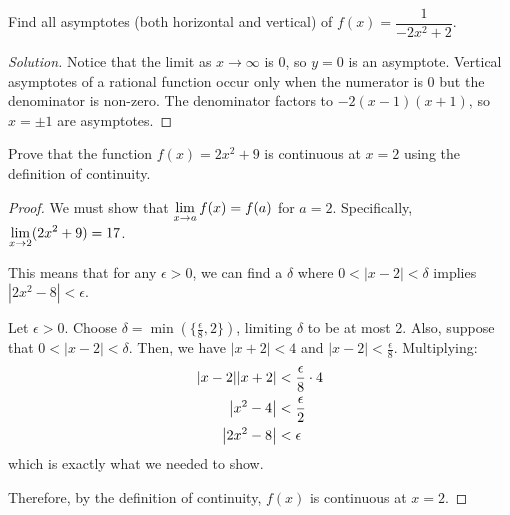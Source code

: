 \question Find all asymptotes (both horizontal and vertical) of $f(x) = \dfrac{1}{-2x^2+2}$.
\begin{proof}[Solution]
  Notice that the limit as $x \to \infty$ is 0, so $y=0$ is an asymptote.
  Vertical asymptotes of a rational function occur only when the numerator is 0 but the denominator is non-zero.
  The denominator factors to $-2(x-1)(x+1)$, so $x=\pm 1$ are asymptotes.
\end{proof}

\question Prove that the function $f(x)=2x^2+9$ is continuous at $x=2$ using the \epsdel{} definition of continuity.
\begin{proof}
  We must show that $\displaystyle\lim_{x\to a}f(x) = f(a)$ for $a=2$.
  Specifically, $\displaystyle\lim_{x\to2} (2x^2+9) = 17$.

  This means that for any $\epsilon > 0$, we can find a $\delta$ where $0 < |x-2| < \delta$
  implies $|2x^2-8| < \epsilon$.

  Let $\epsilon > 0$.
  Choose $\delta = \min(\{\frac{\epsilon}{8},2\})$, limiting $\delta$ to be at most 2.
  Also, suppose that $0 < |x-2| < \delta$.
  Then, we have $|x+2| < 4$ and $|x-2| < \frac{\epsilon}{8}$.
  Multiplying:
  \begin{align*}
    \abs{x-2}\abs{x+2} & < \frac{\epsilon}{8} \cdot 4 \\
    \abs{x^2-4}        & < \frac{\epsilon}{2}         \\
    \abs{2x^2-8}       & < \epsilon
  \end{align*}
  which is exactly what we needed to show.

  Therefore, by the \epsdel{} definition of continuity, $f(x)$ is continuous at $x=2$.
\end{proof}


